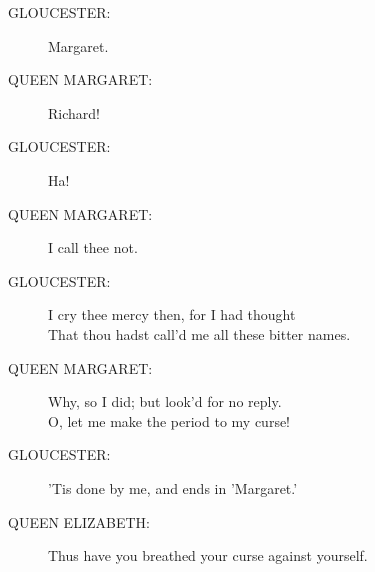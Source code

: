 \documentclass{article}
\begin{document}
\begin{description}
\item[GLOUCESTER:] 
\hspace{1pt}Margaret.\\
\end{description}
\begin{description}
\item[QUEEN MARGARET:] 
\hspace{1pt}Richard!\\
\end{description}
\begin{description}
\item[GLOUCESTER:] 
\hspace{1pt}Ha!\\
\end{description}
\begin{description}
\item[QUEEN MARGARET:] 
\hspace{1pt}I call thee not.\\
\end{description}
\begin{description}
\item[GLOUCESTER:] 
\hspace{1pt}I cry thee mercy then, for I had thought\\
\hspace{1pt}That thou hadst call'd me all these bitter names.\\
\end{description}
\begin{description}
\item[QUEEN MARGARET:] 
\hspace{1pt}Why, so I did; but look'd for no reply.\\
\hspace{1pt}O, let me make the period to my curse!\\
\end{description}
\begin{description}
\item[GLOUCESTER:] 
\hspace{1pt}'Tis done by me, and ends in 'Margaret.'\\
\end{description}
\begin{description}
\item[QUEEN ELIZABETH:] 
\hspace{1pt}Thus have you breathed your curse against yourself.\\
\end{description}
\end{document}

